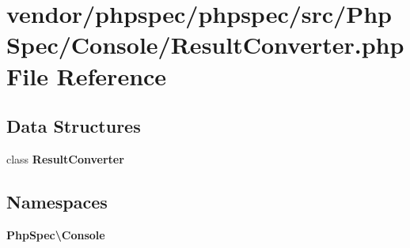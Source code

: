 \section{vendor/phpspec/phpspec/src/\+Php\+Spec/\+Console/\+Result\+Converter.php File Reference}
\label{_result_converter_8php}
\subsection*{Data Structures}
\begin{DoxyCompactItemize}
\item 
class {\bf Result\+Converter}
\end{DoxyCompactItemize}
\subsection*{Namespaces}
\begin{DoxyCompactItemize}
\item 
 {\bf Php\+Spec\textbackslash{}\+Console}
\end{DoxyCompactItemize}

